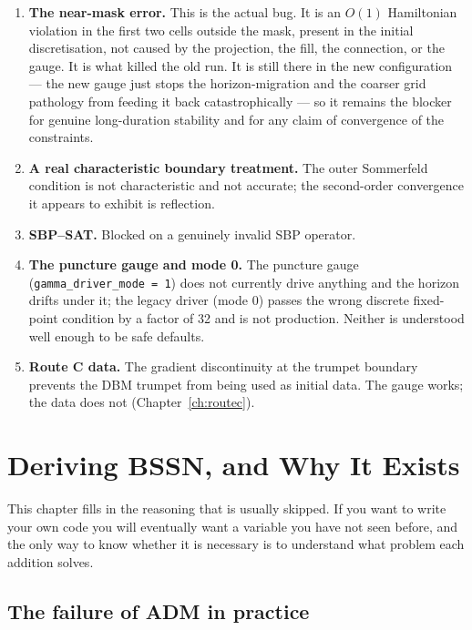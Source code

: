 \documentclass[11pt,openany]{book}
\begin{document}
\begin{enumerate}
\item \textbf{The near-mask error.} This is the actual bug. It is an $O(1)$
      Hamiltonian violation in the first two cells outside the mask, present in
      the initial discretisation, not caused by the projection, the fill, the
      connection, or the gauge. It is what killed the old run. It is still
      there in the new configuration --- the new gauge just stops the
      horizon-migration and the coarser grid pathology from feeding it back
      catastrophically --- so it remains the blocker for genuine long-duration
      stability and for any claim of convergence of the constraints.
\item \textbf{A real characteristic boundary treatment.} The outer Sommerfeld
      condition is not characteristic and not accurate; the second-order
      convergence it appears to exhibit is reflection.
\item \textbf{SBP--SAT.} Blocked on a genuinely invalid SBP operator.
\item \textbf{The puncture gauge and mode 0.} The puncture gauge
      (\texttt{gamma\_driver\_mode = 1}) does not currently drive anything and
      the horizon drifts under it; the legacy driver (mode 0) passes the wrong
      discrete fixed-point condition by a factor of 32 and is not production.
      Neither is understood well enough to be safe defaults.
\item \textbf{Route C data.} The gradient discontinuity at the trumpet
      boundary prevents the DBM trumpet from being used as initial data. The
      gauge works; the data does not (Chapter~\ref{ch:routec}).
\end{enumerate}

\chapter{Deriving BSSN, and Why It Exists}
\label{ch:derive}

This chapter fills in the reasoning that is usually skipped. If you want to
write your own code you will eventually want a variable you have not seen
before, and the only way to know whether it is necessary is to understand what
problem each addition solves.

\section{The failure of ADM in practice}
\end{document}
